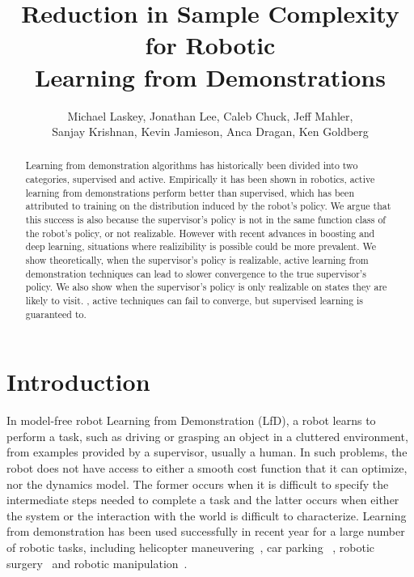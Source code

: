 \documentclass[10pt, conference]{ieeeconf}      %
\title{Reduction in Sample Complexity for Robotic\\
 Learning from Demonstrations}
\author{Michael Laskey, Jonathan Lee, Caleb Chuck, Jeff Mahler,\\ Sanjay Krishnan, Kevin Jamieson, Anca Dragan, Ken Goldberg}
\begin{document}
\maketitle
\thispagestyle{empty}
\pagestyle{empty}







\begin{abstract}
Learning from demonstration algorithms has historically been divided into two categories, supervised and active. Empirically it has been shown in robotics, active learning from demonstrations perform better than supervised, which has been attributed to training on the distribution induced by the robot's policy. We argue that this success is also because the supervisor's policy  is not in the same function class of the robot's policy, or not realizable. However with recent advances in boosting and deep learning, situations where realizibility is possible could be more prevalent.  We show theoretically, when the supervisor's policy is realizable, active learning from demonstration techniques can lead to slower convergence to the true supervisor's policy. We also show when the supervisor's policy is only realizable on states they are likely to visit. , active techniques can fail to converge, but supervised learning is guaranteed to.
 \end{abstract}


\section{Introduction} 
In model-free robot Learning from Demonstration (LfD), a robot learns to perform a task, such as driving or grasping an object in a cluttered environment, from examples provided by a  supervisor, usually a human.  In such problems, the robot does not have access to either a smooth cost function that it can optimize, nor the dynamics model. The former occurs when it is difficult to specify the intermediate steps needed to complete a task and the latter occurs when either the system or the interaction with the world is difficult to characterize. Learning from demonstration has been used successfully in recent year for a large number of robotic tasks, including helicopter maneuvering~\cite{abbeel2007application}, car parking~\cite{abbeel2008apprenticeship} , robotic surgery~\cite{van2010superhuman,laskeyshiv} and robotic manipulation~\cite{laskeyrobot}.
\end{document}
